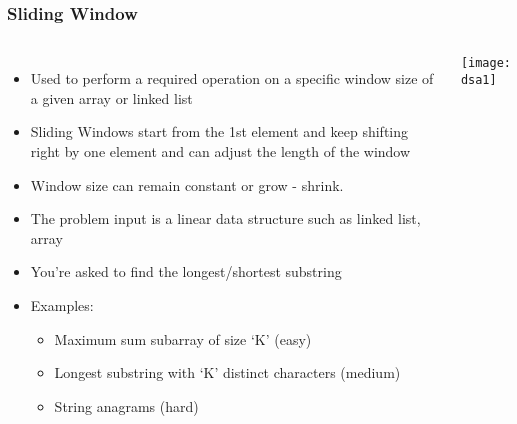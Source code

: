 \begin{frame}[fragile]
	\frametitle{Sliding Window}
	
	\begin{columns}[T]
			\begin{itemize}
				\item Used to perform a required operation on a specific window size of a given array or linked list
				\item Sliding Windows start from the 1st element and keep shifting right by one element and can adjust the length of the window 
				\item Window size can remain constant or grow - shrink.
				\item The problem input is a linear data structure such as linked list, array
				\item You’re asked to find the longest/shortest substring
				\item Examples:
			\begin{itemize}
				\item Maximum sum subarray of size ‘K’ (easy)
				\item Longest substring with ‘K’ distinct characters (medium)
				\item String anagrams (hard)
			\end{itemize}

			\end{itemize}
			
		
\begin{center}
\texttt{[image: dsa1]}
\end{center}	
	\end{columns}		
\end{frame}

